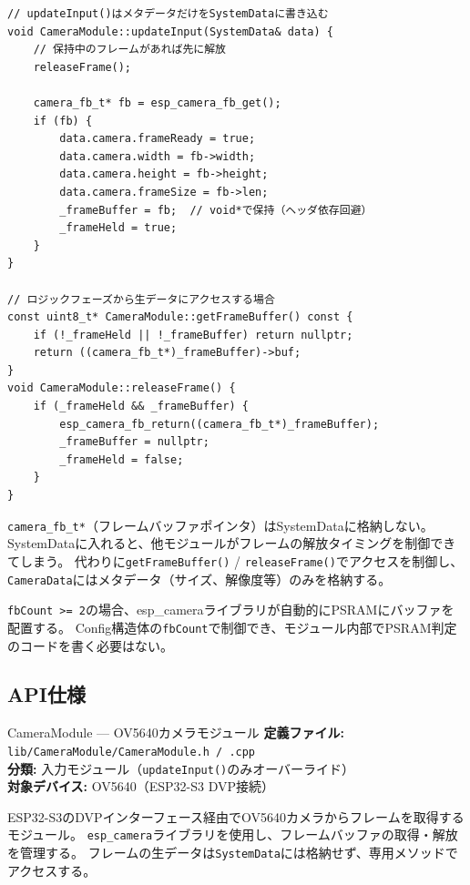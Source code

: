 \begin{lstlisting}[style=cppstyle, caption={CameraModule — フレームバッファ管理}]
// updateInput()はメタデータだけをSystemDataに書き込む
void CameraModule::updateInput(SystemData& data) {
    // 保持中のフレームがあれば先に解放
    releaseFrame();

    camera_fb_t* fb = esp_camera_fb_get();
    if (fb) {
        data.camera.frameReady = true;
        data.camera.width = fb->width;
        data.camera.height = fb->height;
        data.camera.frameSize = fb->len;
        _frameBuffer = fb;  // void*で保持（ヘッダ依存回避）
        _frameHeld = true;
    }
}

// ロジックフェーズから生データにアクセスする場合
const uint8_t* CameraModule::getFrameBuffer() const {
    if (!_frameHeld || !_frameBuffer) return nullptr;
    return ((camera_fb_t*)_frameBuffer)->buf;
}
void CameraModule::releaseFrame() {
    if (_frameHeld && _frameBuffer) {
        esp_camera_fb_return((camera_fb_t*)_frameBuffer);
        _frameBuffer = nullptr;
        _frameHeld = false;
    }
}
\end{lstlisting}

\begin{pointbox}[Data構造体に生データを入れない]
\texttt{camera\_fb\_t*}（フレームバッファポインタ）はSystemDataに格納しない。
SystemDataに入れると、他モジュールがフレームの解放タイミングを制御できてしまう。
代わりに\texttt{getFrameBuffer()} / \texttt{releaseFrame()}でアクセスを制御し、
\texttt{CameraData}にはメタデータ（サイズ、解像度等）のみを格納する。
\end{pointbox}

\begin{notebox}[PSRAMの自動配置]
\texttt{fbCount >= 2}の場合、esp\_cameraライブラリが自動的にPSRAMにバッファを配置する。
Config構造体の\texttt{fbCount}で制御でき、モジュール内部でPSRAM判定のコードを書く必要はない。
\end{notebox}

\subsection{API仕様}


\begin{apibox}{CameraModule --- OV5640カメラモジュール}
\textbf{定義ファイル:} \texttt{lib/CameraModule/CameraModule.h / .cpp}\\
\textbf{分類:} 入力モジュール（\texttt{updateInput()}のみオーバーライド）\\
\textbf{対象デバイス:} OV5640（ESP32-S3 DVP接続）

ESP32-S3のDVPインターフェース経由でOV5640カメラからフレームを取得するモジュール。
\texttt{esp\_camera}ライブラリを使用し、フレームバッファの取得・解放を管理する。
フレームの生データは\texttt{SystemData}には格納せず、専用メソッドでアクセスする。
\end{apibox}

